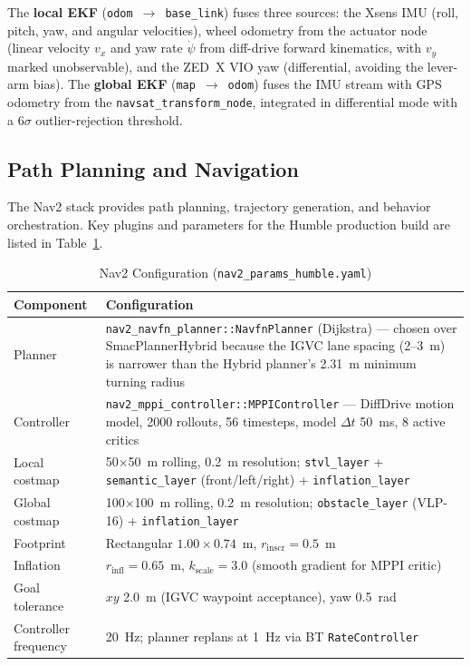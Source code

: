 \documentclass[11pt, letterpaper]{article}
\begin{document}
The \textbf{local EKF} (\texttt{odom}~$\to$~\texttt{base\_link}) fuses three sources: the
Xsens IMU (roll, pitch, yaw, and angular velocities), wheel odometry from the actuator
node (linear velocity $v_x$ and yaw rate $\dot\psi$ from diff-drive forward kinematics, with
$v_y$ marked unobservable), and the ZED~X VIO yaw (differential, avoiding the lever-arm
bias). The \textbf{global EKF} (\texttt{map}~$\to$~\texttt{odom}) fuses the IMU stream
with GPS odometry from the \texttt{navsat\_transform\_node}, integrated in differential mode
with a 6$\sigma$ outlier-rejection threshold.

\subsection{Path Planning and Navigation}

The Nav2 stack provides path planning, trajectory generation, and behavior orchestration.
Key plugins and parameters for the Humble production build are listed in Table~\ref{tab:nav2}.

\begin{table}[H]
    \centering
    \small
    \caption{Nav2 Configuration (\texttt{nav2\_params\_humble.yaml})}
    \label{tab:nav2}
    \begin{tabularx}{\textwidth}{l X}
        \toprule
        \textbf{Component} & \textbf{Configuration} \\
        \midrule
        Planner & \texttt{nav2\_navfn\_planner::NavfnPlanner} (Dijkstra) --- chosen over SmacPlannerHybrid because the IGVC lane spacing (2--3~m) is narrower than the Hybrid planner's 2.31~m minimum turning radius \\
        Controller & \texttt{nav2\_mppi\_controller::MPPIController} --- DiffDrive motion model, 2000 rollouts, 56 timesteps, model $\Delta t$ 50~ms, 8 active critics \\
        Local costmap & 50$\times$50~m rolling, 0.2~m resolution; \texttt{stvl\_layer} + \texttt{semantic\_layer} (front/left/right) + \texttt{inflation\_layer} \\
        Global costmap & 100$\times$100~m rolling, 0.2~m resolution; \texttt{obstacle\_layer} (VLP-16) + \texttt{inflation\_layer} \\
        Footprint & Rectangular $1.00 \times 0.74$~m, $r_{\text{inscr}} = 0.5$~m \\
        Inflation & $r_{\text{infl}} = 0.65$~m, $k_{\text{scale}} = 3.0$ (smooth gradient for MPPI critic) \\
        Goal tolerance & $xy$ 2.0~m (IGVC waypoint acceptance), yaw 0.5~rad \\
        Controller frequency & 20~Hz; planner replans at 1~Hz via BT \texttt{RateController} \\
        \bottomrule
    \end{tabularx}
\end{table}
\end{document}
